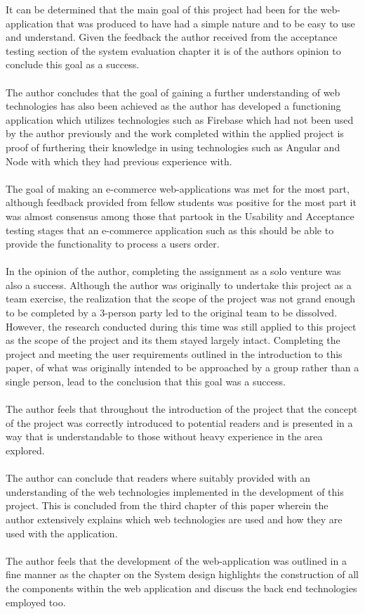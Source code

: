 It can be determined that the main goal of this project had been for the web-application that was produced to have had a simple nature and to be easy to use and understand. Given the feedback the author received from the acceptance testing section of the system evaluation chapter it is of the authors opinion to conclude this goal as a success. \\ \\
The author concludes that the goal of gaining a further understanding of web technologies has also been achieved as the author has developed a functioning application which utilizes technologies such as Firebase which had not been used by the author previously and the work completed within the applied project is proof of furthering their knowledge in using technologies such as Angular and Node with which they had previous experience with. \\ \\
The goal of making an e-commerce web-applications was met for the most part, although feedback provided from fellow students was positive for the most part it was almost consensus among those that partook in the Usability and Acceptance testing stages that an e-commerce application such as this should be able to provide the functionality to process a users order. \\ \\
In the opinion of the author, completing the assignment as a solo venture was also a success. Although the author was originally to undertake this project as a team exercise, the realization that the scope of the project was not grand enough to be completed by a 3-person party led to the original team to be dissolved. However, the research conducted during this time was still applied to this project as the scope of the project and its them stayed largely intact. Completing the project and meeting the user requirements outlined in the introduction to this paper, of what was originally intended to be approached by a group rather than a single person, lead to the conclusion that this goal was a success. \\ \\
The author feels that throughout the introduction of the project that the concept of the project was correctly introduced to potential readers and is presented in a way that is understandable to those without heavy experience in the area explored. \\ \\ 
The author can conclude that readers where suitably provided with an understanding of the web technologies implemented in the development of this project. This is concluded from the third chapter of this paper wherein the author extensively explains which web technologies are used and how they are used with the application. \\ \\
The author feels that the development of the web-application was outlined in a fine manner as the chapter on the System design highlights the construction of all the components within the web application and discuss the back end technologies employed too.

